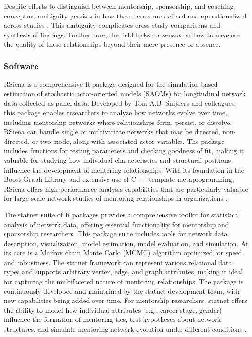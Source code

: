 \documentclass[main.tex]{subfiles}
\begin{document}
Despite efforts to distinguish between mentorship, sponsorship, and coaching, conceptual ambiguity persists in how these terms are defined and operationalized across studies \cite{alachkar2023sponsor, rsna2021mentorship}. This ambiguity complicates cross-study comparisons and synthesis of findings. Furthermore, the field lacks consensus on how to measure the quality of these relationships beyond their mere presence or absence.

\subsubsection{Software}

RSiena is a comprehensive R package designed for the simulation-based estimation of stochastic actor-oriented models (SAOMs) for longitudinal network data collected as panel data. Developed by Tom A.B. Snijders and colleagues, this package enables researchers to analyze how networks evolve over time, including mentorship networks where relationships form, persist, or dissolve. RSiena can handle single or multivariate networks that may be directed, non-directed, or two-mode, along with associated actor variables. The package includes functions for testing parameters and checking goodness of fit, making it valuable for studying how individual characteristics and structural positions influence the development of mentoring relationships. With its foundation in the Boost Graph Library and extensive use of C++ template metaprogramming, RSiena offers high-performance analysis capabilities that are particularly valuable for large-scale network studies of mentoring relationships in organizations \cite{cran2023rsiena}.

The statnet suite of R packages provides a comprehensive toolkit for statistical analysis of network data, offering essential functionality for mentorship and sponsorship researchers. This package suite includes tools for network data description, visualization, model estimation, model evaluation, and simulation. At its core is a Markov chain Monte Carlo (MCMC) algorithm optimized for speed and robustness. The statnet framework can represent various relational data types and supports arbitrary vertex, edge, and graph attributes, making it ideal for capturing the multifaceted nature of mentoring relationships. The package is continuously developed and maintained by the statnet development team, with new capabilities being added over time. For mentorship researchers, statnet offers the ability to model how individual attributes (e.g., career stage, gender) influence the formation of mentoring ties, test hypotheses about network structures, and simulate mentoring network evolution under different conditions \cite{cran2023statnet}.
\end{document}
